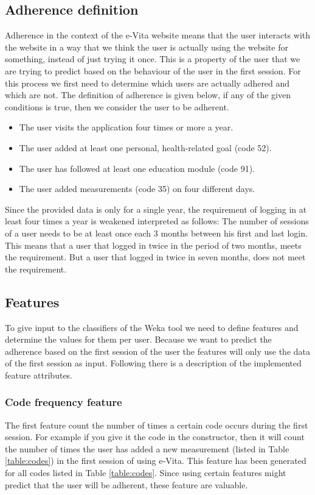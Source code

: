 \subsection{Adherence definition}
Adherence in the context of the e-Vita website means that the user interacts with the website in a way that we think the user is actually using the website for something, instead of just trying it once. This is a property of the user that we are trying to predict based on the behaviour of the user in the first session. For this process we first need to determine which users are actually adhered and which are not. The definition of adherence is given below, if any of the given conditions is true, then we consider the user to be adherent.

\begin{itemize}
	\item The user visits the application four times or more a year.
	\item The user added at least one personal, health-related goal (code 52).
	\item The user has followed at least one education module (code 91).
	\item The user added measurements (code 35) on four different days.
\end{itemize}

Since the provided data is only for a single year, the requirement of logging in at least four times a year is weakened interpreted as follows: The number of sessions of a user needs to be at least once each 3 months between his first and last login. This means that a user that logged in twice in the period of two months, meets the requirement. But a user that logged in twice in seven months, does not meet the requirement. 

\subsection{Features} \label{subsection:features}
To give input to the classifiers of the Weka tool we need to define features and determine the values for them per user. Because we want to predict the adherence based on the first session of the user the features will only use the data of the first session as input. Following there is a description of the implemented feature attributes.

\subsubsection{Code frequency feature}
The first feature count the number of times a certain code occurs during the first session. For example if you give it the code  in the constructor, then it will count the number of times the user has added a new measurement (listed in Table \ref{table:codes}) in the first session of using e-Vita. This feature has been generated for all codes listed in Table \ref{table:codes}. Since using certain features might predict that the user will be adherent, these feature are valuable.

